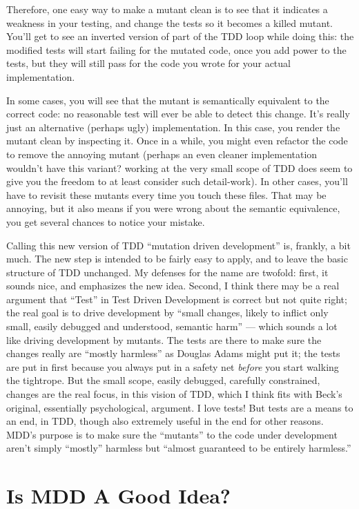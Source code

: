 \documentclass[sigplan,screen]{acmart}
\begin{document}
Therefore, one easy way to make a mutant clean is to see that
it indicates a weakness in your testing, and change the tests so it
becomes a killed mutant.  You'll
get to see an inverted version of part of the TDD loop while doing this:  the
modified tests will start failing for the mutated code, once you add power to
the tests, but  they will still pass for the code you wrote for your
actual implementation.

In some cases, you will see that the mutant is semantically equivalent
to the correct code: no reasonable test will ever be able to detect
this change.  It's really just an alternative (perhaps ugly)
implementation.  In this case, you render the mutant clean by
inspecting it.  Once in a while, you might even refactor the
code to remove the annoying mutant (perhaps an even cleaner implementation
wouldn't have this variant?  working at the very small scope of TDD
does seem to give you the freedom to at least consider such
detail-work).  In other cases, you'll have to revisit these mutants
every time you touch these files.  That may be annoying, but it also
means if you were wrong about the semantic equivalence, you get several
chances to notice your mistake.

Calling this new version of TDD ``mutation driven development'' is, frankly,
a bit much.  The new step is intended to be fairly easy to apply, and
to leave the basic structure of TDD unchanged.  My defenses for
the name are
twofold:  first, it sounds nice, and emphasizes the new idea.  Second,
I think there may be a real  argument that ``Test'' in Test Driven Development
is correct but not quite right; the real goal is to drive development
by ``small changes, likely to inflict only small, easily debugged and understood, semantic harm'' ---
which sounds a lot like driving development by mutants.  The tests are
there to make sure the changes really are ``mostly harmless'' as Douglas
Adams might put it; the tests are put in first because you always put
in a safety net \emph{before} you start walking the tightrope.  But
the small scope, easily debugged, carefully constrained, changes are
the real focus, in this vision of TDD, which I think fits with Beck's
original, essentially psychological, argument.  I love tests!  But
tests are a means to an end, in TDD, though also extremely useful in
the end for other reasons.  MDD's purpose is to make sure the
``mutants'' to the code under development aren't simply ``mostly''
harmless but ``almost guaranteed to be entirely harmless.''

\section{Is MDD A Good Idea?}
\end{document}
